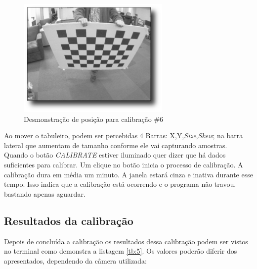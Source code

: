 \begin{figure}[H]
  \includegraphics[width=\linewidth]{Imagens/figura3-19.png}
  \caption{Desmonstração de posição para calibração \#6 \cite{Documentacao-CalibrateMonocularCamera}}\label{fig3:19}
\endminipage
\end{figure}

Ao mover o tabuleiro, podem ser percebidas 4 Barras: X,Y,\textit{Size},\textit{Skew}; na barra lateral que aumentam de tamanho conforme ele vai capturando amostras. Quando o botão \textit{CALIBRATE} estiver iluminado quer dizer que há dados suficientes para calibrar. Um clique no botão inicia o processo de calibração.
A calibração dura em média um minuto. A janela estará cinza e inativa durante esse tempo. Isso indica que a calibração está ocorrendo e o programa não travou, bastando apenas aguardar.

\subsection{Resultados da calibração}

Depois de concluída a calibração os resultados dessa calibração podem ser vistos no terminal como demonstra a listagem \ref{tb:5}. Os valores poderão diferir dos apresentados, dependendo da câmera utilizada:


